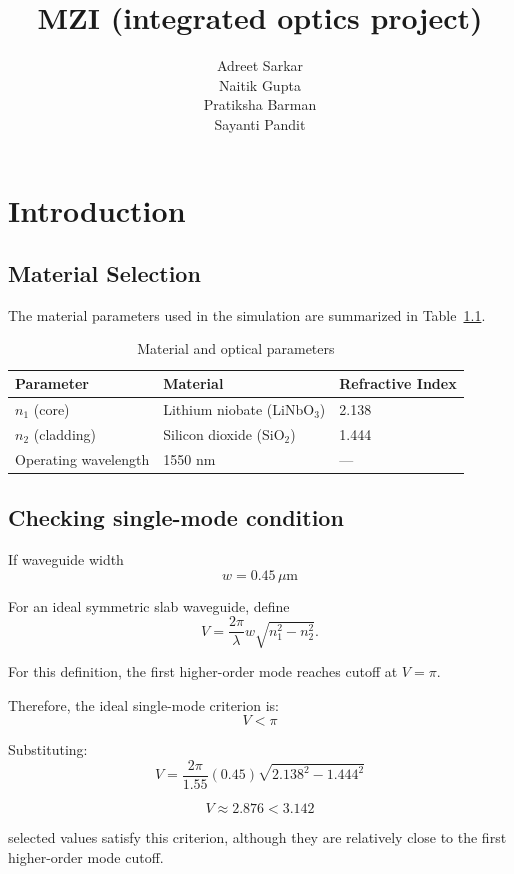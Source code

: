 \documentclass[12pt,a4paper]{report}
\title{MZI (integrated optics project)}
\author{Adreet Sarkar\\
Naitik Gupta\\
Pratiksha Barman\\
Sayanti Pandit}
\date{}
\begin{document}
\maketitle

\chapter{Introduction}



\section{Material Selection}

The material parameters used in the simulation
are summarized in Table~\ref{tab:parameters}.

\begin{table}[htbp]
    \centering
    \caption{Material and optical parameters}
    \label{tab:parameters}

    \begin{tabular}{lll}
        \toprule
        \textbf{Parameter} &
        \textbf{Material} &
        \textbf{Refractive Index} \\
        \midrule

        $n_1$ (core) &
        Lithium niobate (LiNbO$_3$) &
        2.138 \\

        $n_2$ (cladding) &
        Silicon dioxide (SiO$_2$) &
        1.444 \\

        Operating wavelength &
        1550 nm &
        --- \\

        \bottomrule
    \end{tabular}
\end{table}

\section{Checking single-mode condition}

If waveguide width
\[ w=0.45\,\mu\mathrm m
\]

For an ideal symmetric slab waveguide, define
\[
V=\frac{2\pi}{\lambda}w\sqrt{n_1^2-n_2^2}.
\]

For this definition, the first higher-order mode reaches cutoff at \(V=\pi\).

Therefore, the ideal single-mode criterion is:
\[
\boxed{V<\pi}
\]

Substituting:
\[
V=\frac{2\pi}{1.55}(0.45)\sqrt{2.138^2-1.444^2}
\]

\[
\boxed{V\approx2.876<3.142}
\]

 selected values satisfy this criterion, although they are relatively close to the first higher-order mode cutoff.
\end{document}
